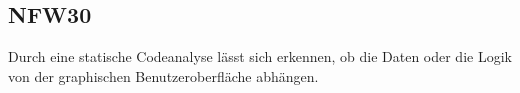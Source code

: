 \subsection*{NFW30}

Durch eine statische Codeanalyse lässt sich erkennen, ob die Daten oder die Logik von der graphischen Benutzeroberfläche abhängen.